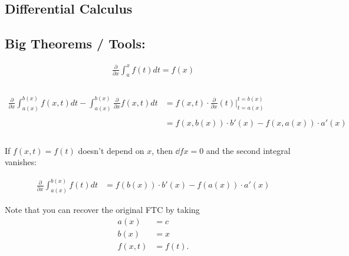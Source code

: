 \hypertarget{differential-calculus}{%
\subsection{Differential Calculus}\label{differential-calculus}}

\hypertarget{big-theorems-tools}{%
\subsection{Big Theorems / Tools:}\label{big-theorems-tools}}

\begin{proposition}

\begin{align*}
\frac{\partial}{\partial x} \int_a^x f(t) dt = f(x) \\ \\
\end{align*}

\end{proposition}

\begin{proposition}

\begin{align*}
\frac{\partial}{\partial x} \int_{a(x)}^{b(x)} f(x, t) dt - \int_{a(x)}^{b(x)} \frac{\partial}{\partial x} f(x, t) dt &=
f(x, t) \cdot \frac{\partial}{\partial x}(t) \bigg\rvert_{t=a(x)}^{t=b(x)} \\ \\
&= f(x, b(x))\cdot b'(x) - f(x, a(x))\cdot a'(x) \\ \\
\end{align*}

If \(f(x,t) = f(t)\) doesn't depend on \(x\), then \(\dd{f}{x} = 0\) and
the second integral vanishes:

\begin{align*}
\frac{\partial}{\partial x} \int_{a(x)}^{b(x)} f(t) dt 
&= f(b(x))\cdot b'(x) - f(a(x))\cdot a'(x)
\end{align*}

\end{proposition}


\begin{remark}

Note that you can recover the original FTC by taking
\begin{align*}  
a(x) &= c \\
b(x) &= x \\
f(x,t) &= f(t)
.\end{align*}

\end{remark}

